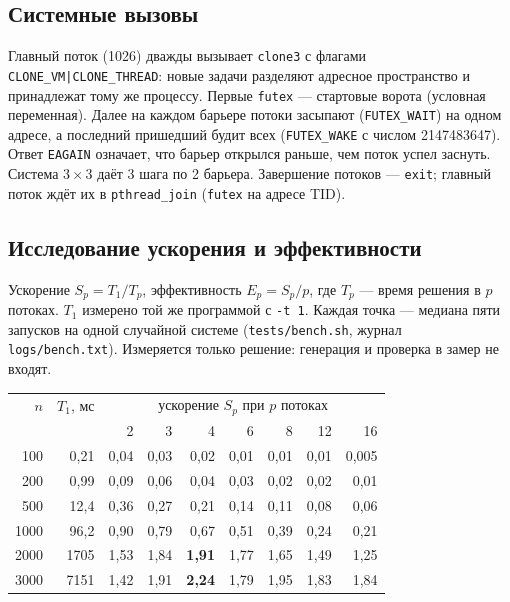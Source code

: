 \subsection{Системные вызовы}



Главный поток (1026) дважды вызывает \texttt{clone3} с флагами
\texttt{CLONE\_VM|CLONE\_THREAD}: новые задачи разделяют адресное пространство
и принадлежат тому же процессу. Первые \texttt{futex} --- стартовые ворота
(условная переменная). Далее на каждом барьере потоки засыпают
(\texttt{FUTEX\_WAIT}) на одном адресе, а последний пришедший будит всех
(\texttt{FUTEX\_WAKE} с числом 2147483647). Ответ \texttt{EAGAIN} означает, что
барьер открылся раньше, чем поток успел заснуть. Система $3 \times 3$ даёт
3 шага по 2 барьера. Завершение потоков --- \texttt{exit}; главный поток ждёт их
в \texttt{pthread\_join} (\texttt{futex} на адресе TID).

\subsection{Исследование ускорения и эффективности}

Ускорение $S_p = T_1 / T_p$, эффективность $E_p = S_p / p$, где $T_p$ --- время
решения в $p$ потоках. $T_1$ измерено той же программой с \texttt{-t 1}.
Каждая точка --- медиана пяти запусков на одной случайной системе
(\texttt{tests/bench.sh}, журнал \texttt{logs/bench.txt}).
Измеряется только решение: генерация и проверка в замер не входят.

\begin{center}
\small
\begin{tabular}{r|r|rrrrrrr}
$n$ & $T_1$, мс & \multicolumn{7}{c}{ускорение $S_p$ при $p$ потоках} \\
 & & 2 & 3 & 4 & 6 & 8 & 12 & 16 \\
\hline
100  & 0,21  & 0,04 & 0,03 & 0,02 & 0,01 & 0,01 & 0,01 & 0,005 \\
200  & 0,99  & 0,09 & 0,06 & 0,04 & 0,03 & 0,02 & 0,02 & 0,01 \\
500  & 12,4  & 0,36 & 0,27 & 0,21 & 0,14 & 0,11 & 0,08 & 0,06 \\
1000 & 96,2  & 0,90 & 0,79 & 0,67 & 0,51 & 0,39 & 0,24 & 0,21 \\
2000 & 1705  & 1,53 & 1,84 & \textbf{1,91} & 1,77 & 1,65 & 1,49 & 1,25 \\
3000 & 7151  & 1,42 & 1,91 & \textbf{2,24} & 1,79 & 1,95 & 1,83 & 1,84 \\
\end{tabular}
\end{center}


